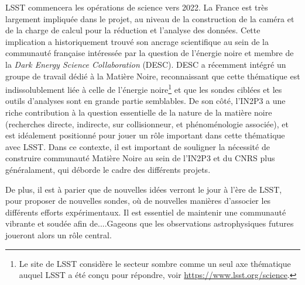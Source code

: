 \documentclass[12pt]{article}
\begin{document}
LSST commencera les opérations de science vers 2022. La France est très largement impliquée dans le projet, au niveau de la construction de la caméra et de la charge de calcul pour la réduction et l'analyse des données. Cette implication a historiquement trouvé son ancrage scientifique au sein de la communauté française intéressée par la question de l'énergie noire et membre de la {\it Dark Energy Science Collaboration} (DESC). DESC a récemment intégré un groupe de travail dédié à la Matière Noire, reconnaissant que cette thématique est indissolublement liée à celle de l'énergie noire\footnote{Le site de LSST considère le secteur sombre comme un seul axe thématique auquel LSST a été conçu pour répondre, voir \href{https://www.lsst.org/science}{https://www.lsst.org/science}. } et que les sondes ciblées et les outils d'analyses sont en grande partie semblables.
De son côté, l'IN2P3 a une riche contribution à la question essentielle de la nature de la matière noire (recherches directe, indirecte, sur collisionneur, et phénoménologie associée), et est idéalement positionné pour jouer un rôle important dans cette thématique avec LSST. Dans ce contexte, il est important de souligner la nécessité de construire communauté Matière Noire au sein de l'IN2P3 et du CNRS plus généralament, qui déborde le cadre des différents projets. 

De plus, il est à parier que de nouvelles idées verront le jour à l'ère de LSST, pour proposer de nouvelles sondes, où de nouvelles manières d'associer les différents efforts expérimentaux. Il est essentiel de maintenir une communauté vibrante et soudée afin de....Gageons que les observations astrophysiques futures joueront alors un rôle central.




\def\bibname{References}
\begingroup
  \small
  \setlength{\bibsep}{0pt plus 0.5ex}
  
  
\endgroup

\end{document}
